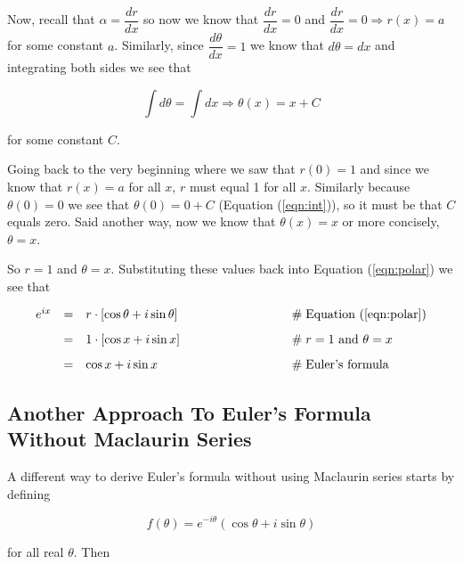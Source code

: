 \documentclass{article}
\theoremstyle{definition}
\begin{document}
\bigskip
\noindent
Now, recall that $\alpha = \dfrac{dr}{dx}$ so now we know that
$\dfrac{dr}{dx} = 0$ and $\dfrac{dr}{dx} = 0 \Rightarrow r(x) =
a$ for some constant $a$.  Similarly, since $\dfrac{d\theta}{dx}
= 1$ we know that $d \theta = dx$ and integrating both sides we
see that

\bigskip
\begin{equation}
\int d \theta  = \int dx \Rightarrow \theta(x) = x + C
\label{eqn:int}
\end{equation}

\bigskip
\noindent
for some constant $C$.

\bigskip
\noindent
Going back to the very beginning where we saw that $r(0) = 1$ and
since we know that $r(x) = a$ for all $x$, $r$ must equal 1 for
all $x$. Similarly because $\theta(0) = 0$ we see that $\theta(0)
= 0 + C$ (Equation (\ref{eqn:int})), so it must be that $C$ equals
zero. Said another way, now we know that $\theta(x) = x$ or more
concisely, $\theta = x$.

\bigskip
\noindent
So $r = 1$ and $\theta = x$. Substituting these values back into
Equation (\ref{eqn:polar}) we see that  

\bigskip
\begin{equation*}
\begin{array}{lllll}
e^{ix} 
&=& r \cdot \left [ \cos \theta + i \sin \theta \right ]
		&\qquad \qquad \qquad \qquad \mathrel{\#} \text{Equation (\ref{eqn:polar})} \\
[8pt]
&=& 1 \cdot \left [ \cos x + i \sin x \right ]
		&\qquad \qquad \qquad \qquad \mathrel{\#} \text{$r = 1$ and $\theta = x$} \\
[8pt]
&=& \cos x + i \sin x
		&\qquad \qquad \qquad \qquad \mathrel{\#} \text{Euler's formula}
\end{array}
\end{equation*}


\medskip
\subsection{Another Approach To Euler's Formula Without Maclaurin Series}
\label{subsec:without_maclaurin1}
A different way to derive Euler's formula without using Maclaurin
series starts by defining  

\bigskip
\begin{equation*}
f(\theta) = e^{-i\theta} \left ( \cos \theta + i\sin \theta \right )
\end{equation*}

\bigskip
\noindent
for all real $\theta$. Then 
\end{document}
